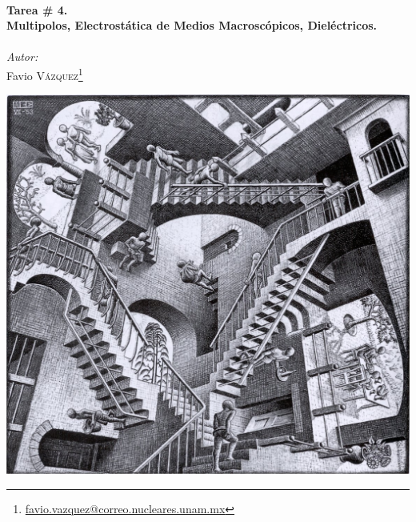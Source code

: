 \documentclass[a4paper,11pt]{article}
\numberwithin{equation}{section}
\begin{document}
\begin{titlepage}

\HRule \\[0.1cm]
{ \huge \bfseries Tarea \# 4. \\ Multipolos, Electrostática 
de Medios Macroscópicos, Dieléctricos.}\\ %
\HRule \\[0.1cm]
 
\setcounter{footnote}{0}
\center
\large
\emph{Autor:} \\ %
\Large Favio \textsc{Vázquez}\footnote[1]{\href{mailto:favio.vazquez@correo.nucleares.unam.mx}{favio.vazquez@correo.nucleares.unam.mx}}


\includegraphics[scale=0.28]{escalerasEscher}


\vfill %

\end{titlepage}
\end{document}
